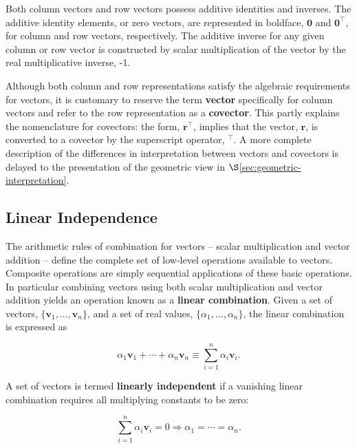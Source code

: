 \documentclass[12pt, twoside, draft]{article}
\begin{document}
Both column vectors and row vectors possess additive identities and inverses.  The additive identity elements, or zero vectors, are represented in boldface, $\mathbf{0}$ and $\mathbf{0}^\top$, for column and row vectors, respectively.  The additive inverse for any given column or row vector is constructed by scalar multiplication of the vector by the real multiplicative inverse, -1.

Although both column and row representations satisfy the algebraic requirements for vectors, it is customary to reserve the term \textbf{vector} specifically for column vectors and refer to the row representation as a \textbf{covector}.  This partly explains the nomenclature for covectors: the form, $\mathbf{r}^\top$, implies that the vector, $\mathbf{r}$, is converted to a covector by the superscript operator, $^\top$.  A more complete description of the differences in interpretation between vectors and covectors is delayed to the presentation of the geometric view in $\S$\ref{sec:geometric-interpretation}.

\subsection{Linear Independence}\label{sec:linear-independence}

The arithmetic rules of combination for vectors -- scalar multiplication and vector addition -- define the complete set of low-level operations available to vectors.  Composite operations are simply sequential applications of these basic operations.  In particular combining vectors using both scalar multiplication and vector addition yields an operation known as a \textbf{linear combination}.  Given a set of vectors, $\{\mathbf{v}_1, \ldots, \mathbf{v}_n\}$, and a set of real values, $\{\alpha_1, \ldots, \alpha_n\}$, the linear combination is expressed as

\begin{equation}\label{eq:linear_combination}
\alpha_1 \mathbf{v}_1 + \cdots + \alpha_n \mathbf{v}_n \equiv \sum_{i=1}^n \alpha_i \mathbf{v}_i .
\end{equation}

A set of vectors is termed \textbf{linearly independent} if a vanishing linear combination requires all multiplying constants to be zero:

\begin{equation}\label{eq:linear_independence}
\sum_{i=1}^n \alpha_i \mathbf{v}_i = 0 \Rightarrow \alpha_1 = \cdots = \alpha_n .
\end{equation}
\end{document}
